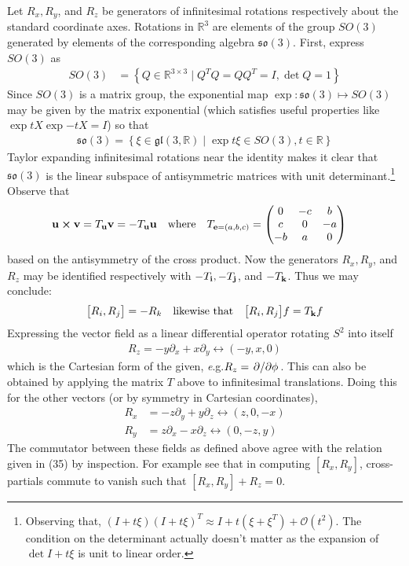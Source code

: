 \documentclass[10pt]{scrartcl}
\newcommand{\eg}{{\textit e.g.}}
\begin{document}
Let $R_x, R_y$, and $R_z$ be generators of infinitesimal rotations respectively about the standard coordinate axes. Rotations in $\mathbb{R}^3$ are elements of the group $SO(3)$ generated by elements of the corresponding algebra $\mathfrak{so}(3)$.  First, express $SO(3)$ as
\begin{align}
	SO(3) &= \left\{Q\in\mathbb{R}^{3\times 3}\mid Q^T Q = Q Q^T = I, \det{Q}=1\right\}	
\end{align}
Since $SO(3)$ is a matrix group, the exponential map $\exp :\mathfrak{so}(3)\mapsto SO(3)$ may be given by the matrix exponential (which satisfies useful properties like $\exp{tX}\exp{-tX}=I$) so that 
\begin{align}
\mathfrak{so}(3) = \left\{\xi\in \mathfrak{gl}(3,\mathbb{R})\mid \exp{t\xi}\in SO(3), t\in\mathbb{R}\right\}	
\end{align}
Taylor expanding infinitesimal rotations near the identity makes it clear that $\mathfrak{so}(3)$ is the linear subspace of antisymmetric matrices with unit determinant.\footnote{Observing that, $(I + t\xi)(I + t\xi)^T \approx I + t(\xi + \xi^T) + \mathcal{O}(t^2)	$.
The condition on the determinant actually doesn't matter as the expansion of $\det{I + t\xi}$ is unit to linear order.} Observe that 
\begin{align}
	\vb{u}\cross\vb{v} &= T_{\vb{u}}\vb{v} = -T_{\vb{u}}\vb{u} \qq{where} T_{\vb{e}=(a, b, c)} = \mqty(0&-c&b\\c&0&-a\\-b&a&0)
\end{align}
based on the antisymmetry of the cross product. Now the generators $R_x, R_y$, and $R_z$ may be identified respectively with $-T_{\vb{i}}, -T_{\vb{j}}$, and $-T_{\vb{k}}$. Thus we may conclude:
\begin{align}
\comm{R_i}{R_j} = -R_k \qq{likewise that} \comm{R_i}{R_j}f = T_{\vb{k}}f 
\end{align}
Expressing the vector field as a linear differential operator rotating $S^2$ into itself
\begin{align*}
	R_z = -y\partial_x + x\partial_y \leftrightarrow (-y, x, 0)
\end{align*}
which is the Cartesian form of the given, \eg $R_z = \pdv*{\phi}$. This can also be obtained by applying the matrix $T$ above to infinitesimal translations. Doing this for the other vectors (or by symmetry in Cartesian coordinates),
\begin{align*}
	R_x &= -z\partial_y + y\partial_z \leftrightarrow (z, 0, -x)\\
	R_y &= z\partial_x - x\partial_z \leftrightarrow (0, -z, y)
\end{align*}
The commutator between these fields as defined above agree with the relation given in (35) by inspection. For example see that in computing $[R_x, R_y]$, cross-partials commute to vanish such that $[R_x, R_y]+R_z = 0$. 
\end{document}
